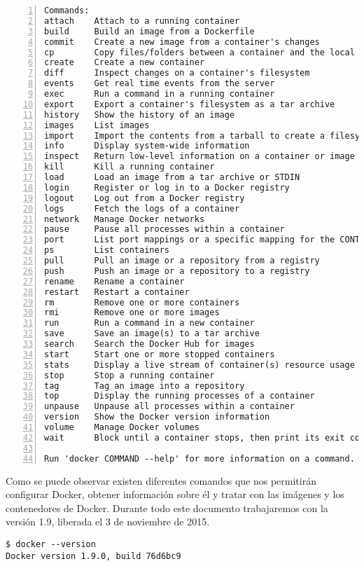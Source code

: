 \begin{lstlisting}[style=consola,numbers=left]
Commands:
attach    Attach to a running container
build     Build an image from a Dockerfile
commit    Create a new image from a container's changes
cp        Copy files/folders between a container and the local filesystem
create    Create a new container
diff      Inspect changes on a container's filesystem
events    Get real time events from the server
exec      Run a command in a running container
export    Export a container's filesystem as a tar archive
history   Show the history of an image
images    List images
import    Import the contents from a tarball to create a filesystem image
info      Display system-wide information
inspect   Return low-level information on a container or image
kill      Kill a running container
load      Load an image from a tar archive or STDIN
login     Register or log in to a Docker registry
logout    Log out from a Docker registry
logs      Fetch the logs of a container
network   Manage Docker networks
pause     Pause all processes within a container
port      List port mappings or a specific mapping for the CONTAINER
ps        List containers
pull      Pull an image or a repository from a registry
push      Push an image or a repository to a registry
rename    Rename a container
restart   Restart a container
rm        Remove one or more containers
rmi       Remove one or more images
run       Run a command in a new container
save      Save an image(s) to a tar archive
search    Search the Docker Hub for images
start     Start one or more stopped containers
stats     Display a live stream of container(s) resource usage statistics
stop      Stop a running container
tag       Tag an image into a repository
top       Display the running processes of a container
unpause   Unpause all processes within a container
version   Show the Docker version information
volume    Manage Docker volumes
wait      Block until a container stops, then print its exit code

Run 'docker COMMAND --help' for more information on a command.
	\end{lstlisting}
	
	Como se puede observar existen diferentes comandos que nos permitirán configurar Docker, obtener información sobre él y tratar con las imágenes y los contenedores de Docker. Durante todo este documento trabajaremos con la versión 1.9, liberada el 3 de noviembre de 2015.
	
	\begin{lstlisting}[style=consola]
$ docker --version
Docker version 1.9.0, build 76d6bc9
	\end{lstlisting}	
	
